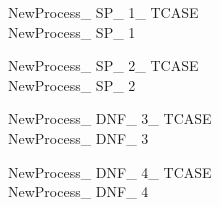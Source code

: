 \documentclass{article}
\begin{document}
\begin{multicols}{2}
\begin{schema}{NewProcess\_ SP\_ 1\_ TCASE}\\
NewProcess\_ SP\_ 1
\end{schema}

\begin{schema}{NewProcess\_ SP\_ 2\_ TCASE}\\
NewProcess\_ SP\_ 2
\end{schema}

\begin{schema}{NewProcess\_ DNF\_ 3\_ TCASE}\\
NewProcess\_ DNF\_ 3
\end{schema}

\begin{schema}{NewProcess\_ DNF\_ 4\_ TCASE}\\
NewProcess\_ DNF\_ 4
\end{schema}

\end{multicols}
\end{document}
